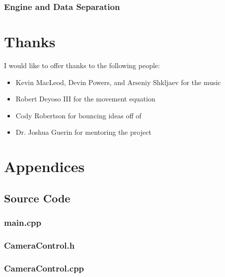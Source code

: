 \documentclass{article}
\begin{document}
\subsubsection{Engine and Data Separation}

\section{Thanks}

I would like to offer thanks to the following people:

\begin{itemize}
	\item Kevin MacLeod, Devin Powers, and Arseniy Shkljaev for the music
	\item Robert Deyoso III for the movement equation
	\item Cody Robertson for bouncing ideas off of
	\item Dr. Joshua Guerin for mentoring the project
\end{itemize}

\section{Appendices}

\subsection{Source Code}

\subsubsection{main.cpp}
	
 				
\subsubsection{CameraControl.h}
	

\subsubsection{CameraControl.cpp}
	
					
\end{document}
